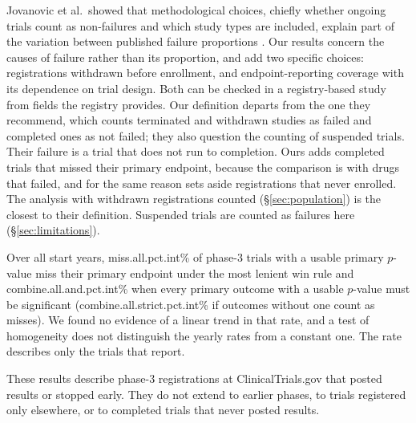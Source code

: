\documentclass[11pt]{article}
\begin{document}
Jovanovic et al.\ showed that methodological choices, chiefly whether ongoing trials count as non-failures and which study types are included, explain part of the variation between published failure proportions \cite{jovanovic2026}. Our results concern the causes of failure rather than its proportion, and add two specific choices: registrations withdrawn before enrollment, and endpoint-reporting coverage with its dependence on trial design. Both can be checked in a registry-based study from fields the registry provides. Our definition departs from the one they recommend, which counts terminated and withdrawn studies as failed and completed ones as not failed; they also question the counting of suspended trials. Their failure is a trial that does not run to completion. Ours adds completed trials that missed their primary endpoint, because the comparison is with drugs that failed, and for the same reason sets aside registrations that never enrolled. The analysis with withdrawn registrations counted (\S\ref{sec:population}) is the closest to their definition. Suspended trials are counted as failures here (\S\ref{sec:limitations}).

Over all start years, \num{miss.all.pct.int}\% of phase-3 trials with a usable primary $p$-value miss their primary endpoint under the most lenient win rule and \num{combine.all.and.pct.int}\% when every primary outcome with a usable $p$-value must be significant (\num{combine.all.strict.pct.int}\% if outcomes without one count as misses). We found no evidence of a linear trend in that rate, and a test of homogeneity does not distinguish the yearly rates from a constant one. The rate describes only the trials that report.

These results describe phase-3 registrations at ClinicalTrials.gov that posted results or stopped early. They do not extend to earlier phases, to trials registered only elsewhere, or to completed trials that never posted results.
\end{document}
